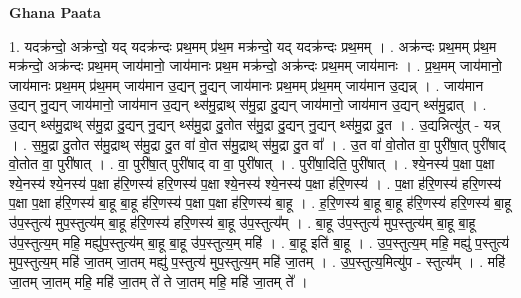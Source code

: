 \documentclass[17pt]{extarticle}
\begin{document}
\textbf{Ghana Paata } \newline

1. यदक्र॑न्दो॒ अक्र॑न्दो॒ यद् यदक्र॑न्दः प्रथ॒मम् प्र॑थ॒म मक्र॑न्दो॒ यद् यदक्र॑न्दः प्रथ॒मम् । . अक्र॑न्दः प्रथ॒मम् प्र॑थ॒म मक्र॑न्दो॒ अक्र॑न्दः प्रथ॒मम् जाय॑मानो॒ जाय॑मानः प्रथ॒म 
मक्र॑न्दो॒ अक्र॑न्दः प्रथ॒मम् जाय॑मानः । . प्र॒थ॒मम् जाय॑मानो॒ जाय॑मानः प्रथ॒मम् प्र॑थ॒मम् जाय॑मान उ॒द्यन् नु॒द्यन् जाय॑मानः प्रथ॒मम् प्र॑थ॒मम् जाय॑मान उ॒द्यन्न् । . जाय॑मान उ॒द्यन् नु॒द्यन् जाय॑मानो॒ जाय॑मान उ॒द्यन् थ्स॑मु॒द्राथ् स॑मु॒द्रा दु॒द्यन् जाय॑मानो॒ जाय॑मान उ॒द्यन् थ्स॑मु॒द्रात् । . उ॒द्यन् थ्स॑मु॒द्राथ् स॑मु॒द्रा दु॒द्यन् नु॒द्यन् थ्स॑मु॒द्रा दु॒तोत स॑मु॒द्रा दु॒द्यन् नु॒द्यन् थ्स॑मु॒द्रा दु॒त । . उ॒द्यन्नित्यु॑त् - यन्न् । . स॒मु॒द्रा दु॒तोत स॑मु॒द्राथ् स॑मु॒द्रा दु॒त वा॑ वो॒त स॑मु॒द्राथ् स॑मु॒द्रा दु॒त वा᳚ । . उ॒त वा॑ वो॒तोत वा॒ पुरी॑षा॒त् पुरी॑षाद् वो॒तोत वा॒ पुरी॑षात् । . वा॒ पुरी॑षा॒त् पुरी॑षाद् वा वा॒ पुरी॑षात् । . पुरी॑षा॒दिति॒ पुरी॑षात् । . श्ये॒नस्य॑ प॒क्षा प॒क्षा श्ये॒नस्य॑ श्ये॒नस्य॑ प॒क्षा ह॑रि॒णस्य॑ हरि॒णस्य॑ प॒क्षा श्ये॒नस्य॑ श्ये॒नस्य॑ प॒क्षा ह॑रि॒णस्य॑ । . प॒क्षा ह॑रि॒णस्य॑ हरि॒णस्य॑ प॒क्षा प॒क्षा ह॑रि॒णस्य॑ बा॒हू बा॒हू ह॑रि॒णस्य॑ प॒क्षा प॒क्षा ह॑रि॒णस्य॑ बा॒हू । . ह॒रि॒णस्य॑ बा॒हू बा॒हू ह॑रि॒णस्य॑ हरि॒णस्य॑ बा॒हू उ॑प॒स्तुत्य॑ मुप॒स्तुत्य॑म् बा॒हू ह॑रि॒णस्य॑ हरि॒णस्य॑ बा॒हू उ॑प॒स्तुत्य᳚म् । . बा॒हू उ॑प॒स्तुत्य॑ मुप॒स्तुत्य॑म् बा॒हू बा॒हू उ॑प॒स्तुत्य॒म् महि॒ मह्यु॑प॒स्तुत्य॑म् बा॒हू बा॒हू उ॑प॒स्तुत्य॒म् महि॑ । . बा॒हू इति॑ बा॒हू । . उ॒प॒स्तुत्य॒म् महि॒ मह्यु॑ प॒स्तुत्य॑ मुप॒स्तुत्य॒म् महि॑ जा॒तम् जा॒तम् मह्यु॑ प॒स्तुत्य॑ मुप॒स्तुत्य॒म् महि॑ जा॒तम् । . उ॒प॒स्तुत्य॒मित्यु॑प - स्तुत्य᳚म् । . महि॑ जा॒तम् जा॒तम् महि॒ महि॑ जा॒तम् ते॑ ते जा॒तम् महि॒ महि॑ जा॒तम् ते᳚ । \newline
\end{document}
